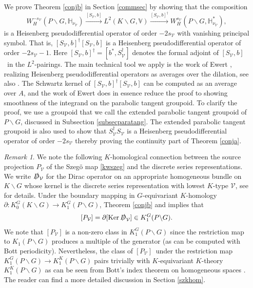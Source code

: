 \documentclass[a4paper,reqno]{amsart}
\numberwithin{equation}{section}
\def\ker{\operatorname{Ker}}
\theoremstyle{definition}
\theoremstyle{remark}
\newtheorem{remark}[thm]{Remark}
\begin{document}
We prove Theorem \ref{conjb} in Section \ref{commsec} by showing that the composition 
$$W^{-s_\mathcal{V}}_{H}(P\backslash G, \mathbb{H}_{\nu_{\mathcal{V}}})\xrightarrow{[S_{\mathcal{V}},b]} L^2(K \backslash G,\mathbb{V})\xrightarrow{[S_{\mathcal{V}},b]^\dagger}W^{s_\mathcal{V}}_{H}(P\backslash G, \mathbb{H}_{\nu_{\mathcal{V}}}^*),$$
is a Heisenberg pseudodifferential operator of order $-2s_\mathcal{V}$ with vanishing principal symbol. That is, $[S_{\mathcal{V}},b]^\dagger [S_{\mathcal{V}},b]$ is a Heisenberg pseudodifferential operator of order $-2s_\mathcal{V}-1$. Here $[S_{\mathcal{V}},b]^\dagger=[b^*,S_{\mathcal{V}}^\dagger]$ denotes the formal adjoint of $[S_{\mathcal{V}},b]$ in the $L^2$-pairings. The main technical tool we apply is the work of Ewert \cite{ewertthesis, ewertfixed}, realizing Heisenberg pseudodifferential operators as averages over the dilation, see also \cite{debordskandav}. The Schwartz kernel of $[S_{\mathcal{V}},b]^\dagger [S_{\mathcal{V}},b]$ can be computed as an average over $A$, and the work of Ewert \cite{ewertthesis, ewertfixed} does in essence reduce the proof to showing smoothness of the integrand on the parabolic tangent groupoid. To clarify the proof, we use a groupoid that we call the extended parabolic tangent groupoid of $P\backslash G$, discussed in Subsection \ref{subsecparatang}. The extended parabolic tangent groupoid is also used to show that $S_{\mathcal{V}}^\dagger S_{\mathcal{V}}$ is a Heisenberg pseudodifferential operator of order $-2s_\mathcal{V}$ thereby proving the continuity part of Theorem \ref{conja}.


\begin{remark}
We note the following $K$-homological connection between the source projection $P_{\mathcal{V}}$ of the Szegö map \eqref{kwszeg} and the discrete series representations. We write $\slashed{D}_{\mathcal{V}}$ for the Dirac operator on an appropriate homogeneous bundle on $K\backslash G$ whose kernel is the discrete series representation with lowest $K$-type $\mathcal{V}$, see \cite{laffaicm} for details. Under the boundary mapping in $G$-equivariant $K$-homology $\partial: K_0^G(K\backslash G)\to K_1^G(P\backslash G)$, Theorem \ref{conjb} and \cite{fries} implies that
$$[P_{\mathcal{V}}]=\partial[\ker \slashed{D}_{\mathcal{V}}]\in K_1^G(P\backslash G).$$
We note that $[P_{\mathcal{V}}]$ is a non-zero class in $K_1^G(P\backslash G)$ since the restriction map to $K_1(P\backslash G)$ produces a multiple of the generator (as can be computed with Bott periodicity). Nevertheless, the class of $[P_{\mathcal{V}}]$ under the restriction map  $K_1^G(P\backslash G)\to K_1^K(P\backslash G)$ pairs trivially with $K$-equivariant $K$-theory $K_1^K(P\backslash G)$ as can be seen from Bott's index theorem on homogeneous spaces \cite{botthomo}. The reader can find a more detailed discussion in Section \ref{szkhom}.
\end{remark}
\end{document}
